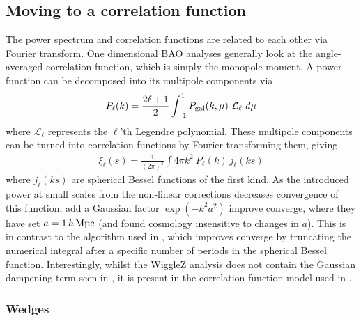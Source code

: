 \documentclass[titlesmallcaps, examinerscopy, copyrightpage]{uqthesis}
\begin{document}
\subsection{Moving to a correlation function} \label{sec:prior:cor}

The power spectrum and correlation functions are related to each other via Fourier transform. One dimensional BAO analyses generally look at the angle-averaged correlation function, which is simply the monopole moment. A power function can be decomposed into its multipole components via 
\begin{align}
P_{\ell}(k) = \frac{2\ell + 1}{2} \int_{-1}^1 P_{\rm{gal}}(k, \mu) \ \mathcal{L}_\ell \  d\mu
\end{align}
where $\mathcal{L}_\ell$ represents the $\ell$'th Legendre polynomial. These multipole components can be turned into correlation functions by Fourier transforming them, giving
\begin{align}
\xi_\ell(s) = \frac{1}{(2\pi)^3} \int 4\pi k^2 \ P_\ell(k) \ j_\ell(ks)
\end{align}
where $j_\ell(ks)$ are spherical Bessel functions of the first kind. As the introduced power at small scales from the non-linear corrections decreases convergence of this function,  \citet{AndersonAubourg2012} add a Gaussian factor $\exp(-k^2 a^2)$ improve converge, where they have set $a= 1\, h\, \rm{Mpc}$ (and found cosmology insensitive to changes in $a$). This is in contrast to the algorithm used in \citet{BlakeDavis2011}, which improves converge by truncating the numerical integral after a specific number of periods in the spherical Bessel function. Interestingly, whilst the \citet{BlakeDavis2011} WiggleZ analysis does not contain the Gaussian dampening term seen in \citet{AndersonAubourg2012}, it is present in the correlation function model used in \citet{BlakeKazin2011}.

\subsubsection{Wedges}
\end{document}
